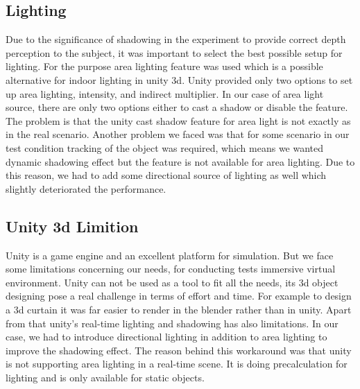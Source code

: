 \subsection{Lighting}
Due to the significance of shadowing in the experiment to provide correct depth perception to the subject, it was important to select the best possible setup for lighting. For the purpose area lighting feature was used which is a possible alternative for indoor lighting in unity 3d. Unity provided only two options to set up area lighting, intensity, and indirect multiplier. In our case of area light source, there are only two options either to cast a shadow or disable the feature. The problem is that the unity cast shadow feature for area light is not exactly as in the real scenario. Another problem we faced was that for some scenario in our test condition tracking of the object was required, which means we wanted dynamic shadowing effect but the feature is not available for area lighting. Due to this reason, we had to add some directional source of lighting as well which slightly deteriorated the performance.    

\subsection{Unity 3d Limition}
Unity is a game engine and an excellent platform for simulation. But we face some limitations concerning our needs, for conducting tests immersive virtual environment. Unity can not be used as a tool to fit all the needs, its 3d object designing pose a real challenge in terms of effort and time. For example to design a 3d curtain it was far easier to render in the blender rather than in unity. Apart from that unity’s real-time lighting and shadowing has also limitations. In our case, we had to introduce directional lighting in addition to area lighting to improve the shadowing effect. The reason behind this workaround was that unity is not supporting area lighting in a real-time scene. It is doing precalculation for lighting and is only available for static objects.   

